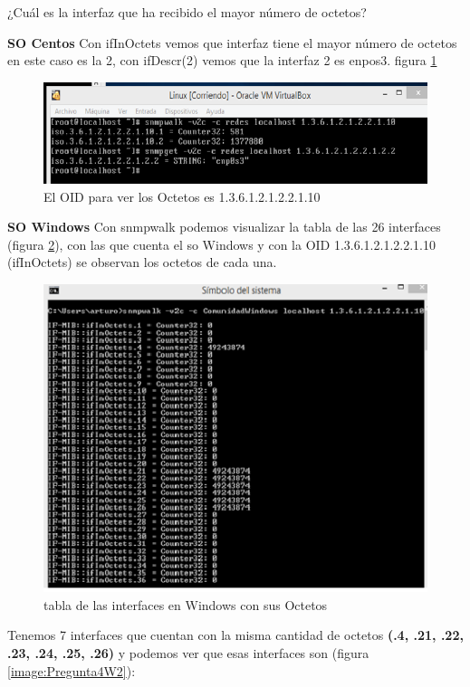 \item ¿Cuál es la interfaz que ha recibido el mayor número de octetos?

\textbf{SO Centos}
Con ifInOctets vemos que interfaz tiene el mayor número de octetos en este caso es la 2, con ifDescr(2) vemos que la interfaz  2 es enpos3.
figura  \ref{image:Pregunta4O}
\FloatBarrier
\begin{figure}[htbp!]
		\centering
		    \includegraphics[width=.9 \textwidth]{../images/Pregunta4O.png} 
		\caption{El OID para ver los Octetos es 1.3.6.1.2.1.2.2.1.10}
		\label{image:Pregunta4O}
\end{figure}
\FloatBarrier

\textbf{SO Windows}
Con snmpwalk  podemos visualizar la tabla de las 26 interfaces (figura  \ref{image:Pregunta4W}), con las que cuenta el so Windows y con la OID 1.3.6.1.2.1.2.2.1.10 (ifInOctets) se observan los octetos de cada una.


\FloatBarrier
\begin{figure}[htbp!]
		\centering
		    \includegraphics[width=.7 \textwidth]{../images/Pregunta4W.png} 
		\caption{tabla de las interfaces en Windows con sus Octetos}
		\label{image:Pregunta4W}
\end{figure}
\FloatBarrier

Tenemos 7 interfaces que cuentan con la misma cantidad de octetos \textbf{(.4, .21, .22, .23, .24, .25, .26)} y podemos ver que esas interfaces son (figura  \ref{image:Pregunta4W2}):
 
